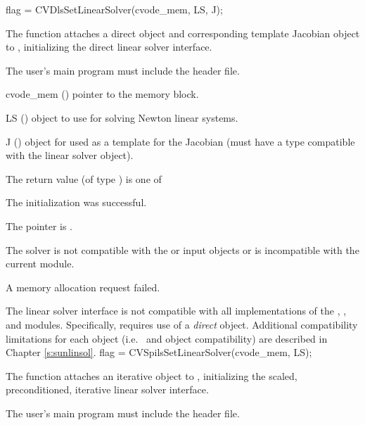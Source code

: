 {
  flag = CVDlsSetLinearSolver(cvode\_mem, LS, J);
}
{
  The function  attaches a direct
  {\sunlinsol} object  and corresponding template
  Jacobian {\sunmatrix} object  to {\cvode}, initializing the
  {\cvdls} direct linear solver interface.

  The user's main program must include the  header file.
}
{
  \begin{args}
  \item[cvode\_mem] ()
    pointer to the {\cvode} memory block.
  \item[LS] ()
    {\sunlinsol} object to use for solving Newton linear systems. 
  \item[J] ()
    {\sunmatrix} object for used as a template for the Jacobian (must
    have a type compatible with the linear solver object).
  \end{args}
}
{
  The return value  (of type ) is one of
  \begin{args}
  \item[\Id{CVDLS\_SUCCESS}] 
    The {\cvdls} initialization was successful.
  \item[\Id{CVDLS\_MEM\_NULL}]
    The  pointer is .
  \item[\Id{CVDLS\_ILL\_INPUT}]
    The {\cvdls} solver is not compatible with the  or
     input objects or is incompatible with the current
    {\nvector} module.
  \item[\Id{CVDLS\_MEM\_FAIL}]
    A memory allocation request failed.
  \end{args}
}
{
  The {\cvdls} linear solver interface is not compatible with all
  implementations of the {\sunlinsol}, {\sunmatrix}, and {\nvector}
  modules.  Specifically, {\cvdls} requires use of a \emph{direct}
  {\sunlinsol} object.  Additional compatibility limitations for each
  {\sunlinsol} object (i.e.~{\sunmatrix} and {\nvector} object
  compatibility) are described in Chapter \ref{s:sunlinsol}.
}
{
  flag = CVSpilsSetLinearSolver(cvode\_mem, LS);
}
{
  The function  attaches an iterative
  {\sunlinsol} object  to {\cvode}, initializing the
  {\cvspils} scaled, preconditioned, iterative linear solver
  interface.

  The user's main program must include the  header
  file.
}
